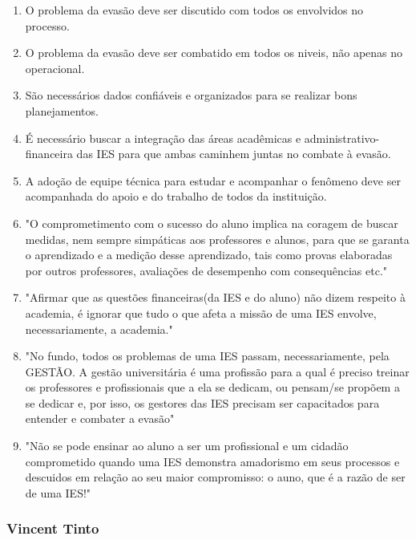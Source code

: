 \documentclass{report}
\begin{document}
\begin{enumerate}

\item O problema da evasão deve ser discutido com todos os envolvidos no processo.

\item O problema da evasão deve ser combatido em todos os niveis, não apenas no operacional.

\item São necessários dados confiáveis e organizados para se realizar bons planejamentos.

\item É necessário buscar a integração das áreas acadêmicas e administrativo-financeira das IES para que ambas caminhem juntas no combate à evasão.

\item A adoção de equipe técnica para estudar e acompanhar o fenômeno deve ser acompanhada do apoio e do trabalho de todos da instituição.

\item "O comprometimento com o sucesso do aluno implica na coragem de buscar medidas, nem sempre simpáticas aos professores e alunos, para que se garanta o aprendizado e a medição desse aprendizado, tais como provas elaboradas por outros professores, avaliações de desempenho com consequências etc."

\item "Afirmar que as questões financeiras(da IES e do aluno) não dizem respeito à academia, é ignorar que tudo o que afeta a missão de uma IES envolve, necessariamente, a academia."

\item "No fundo, todos os problemas de uma IES passam, necessariamente, pela GESTÃO. A gestão universitária é uma profissão para a qual é preciso treinar os professores e profissionais que a ela se dedicam, ou pensam/se propõem a se dedicar e, por isso, os gestores das IES precisam ser capacitados para entender e combater a evasão"

\item "Não se pode ensinar ao aluno a ser um profissional e um cidadão comprometido quando uma IES demonstra amadorismo em seus processos e descuidos em relação ao seu maior compromisso: o auno, que é a razão de ser de uma IES!"

\end{enumerate}

\subsubsection{Vincent Tinto}
\end{document}
